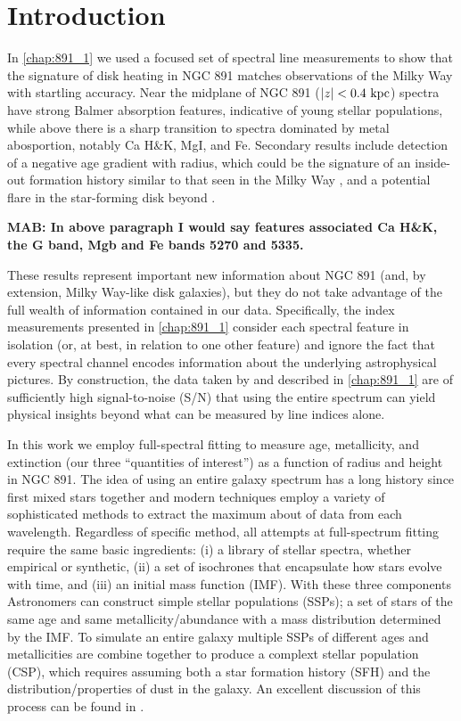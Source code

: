 \section{Introduction}

In \ref{chap:891_1} we used a focused set of spectral line
measurements to show that the signature of disk heating in NGC 891
matches observations of the Milky Way \citep[e.g.,][]{Bovy12,
  Hayden15} with startling accuracy. Near the midplane of NGC 891
($|z| < 0.4~\mathrm{kpc} $) spectra have strong Balmer absorption
features, indicative of young stellar populations, while above
 there is a sharp transition to spectra dominated by
metal abosportion, notably Ca H\&K, MgI, and Fe. Secondary results
include detection of a negative age gradient with radius, which could
be the signature of an inside-out formation history similar to that
seen in the Milky Way \citep{REFS}, and a potential flare in the
star-forming disk beyond .

{\bf MAB: In above paragraph I would say features associated Ca H\&K,
  the G band, Mgb and Fe bands 5270 and 5335.}

These results represent important new information about NGC 891 (and,
by extension, Milky Way-like disk galaxies), but they do not take
advantage of the full wealth of information contained in our
data. Specifically, the index measurements presented in
\ref{chap:891_1} consider each spectral feature in isolation
(or, at best, in relation to one other feature) and ignore the fact
that every spectral channel encodes information about the underlying
astrophysical pictures. By construction, the data taken by \GP and
described in \ref{chap:891_1} are of sufficiently high
signal-to-noise (S/N) that using the entire spectrum can yield
physical insights beyond what can be measured by line indices alone.

In this work we employ full-spectral fitting to measure age,
metallicity, and extinction (our three ``quantities of interest'') as
a function of radius and height in NGC 891. The idea of using an
entire galaxy spectrum has a long history since \citet{Spinrad71}
first mixed stars together and modern techniques employ a variety of
sophisticated methods to extract the maximum about of data from each
wavelength. Regardless of specific method, all attempts at
full-spectrum fitting require the same basic ingredients: (i) a
library of stellar spectra, whether empirical or synthetic, (ii) a set
of isochrones that encapsulate how stars evolve with time, and (iii)
an initial mass function (IMF). With these three components
Astronomers can construct simple stellar populations (SSPs); a set of
stars of the same age and same metallicity/abundance with a mass
distribution determined by the IMF. To simulate an entire galaxy
multiple SSPs of different ages and metallicities are combine together
to produce a complext stellar population (CSP), which requires
assuming both a star formation history (SFH) and the
distribution/properties of dust in the galaxy. An excellent discussion
of this process can be found in \citet[especially his Figure
  1]{Conroy13}.

